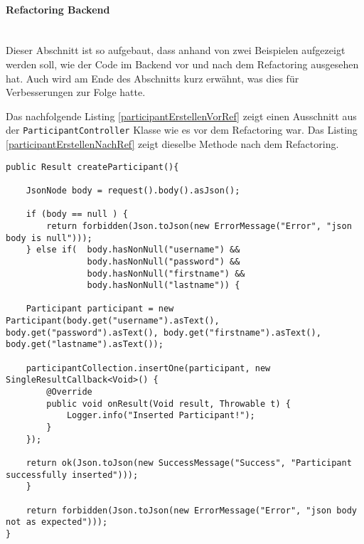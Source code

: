\paragraph*{Refactoring Backend}~\\
Dieser Abschnitt ist so aufgebaut, dass anhand von zwei Beispielen aufgezeigt werden soll, wie der Code im Backend vor und nach dem Refactoring ausgesehen hat. Auch wird am Ende des Abschnitts kurz erwähnt, was dies für Verbesserungen zur Folge hatte.

Das nachfolgende Listing \ref{participantErstellenVorRef} zeigt einen Ausschnitt aus der \texttt{Participant\-Controller} Klasse wie es vor dem Refactoring war. Das Listing \ref{participantErstellenNachRef} zeigt dieselbe Methode nach dem Refactoring.

\lstset{language=JAVA, showstringspaces=false, frame=single, captionpos=b, label=createParticipant, breaklines=true, numbers=left}
\begin{lstlisting}[caption={Participant erstellen vor Refactoring}, label=participantErstellenVorRef]
public Result createParticipant(){

    JsonNode body = request().body().asJson();

    if (body == null ) {
        return forbidden(Json.toJson(new ErrorMessage("Error", "json body is null")));
    } else if(  body.hasNonNull("username") &&
            	body.hasNonNull("password") &&
            	body.hasNonNull("firstname") &&
            	body.hasNonNull("lastname")) {

    Participant participant = new Participant(body.get("username").asText(), body.get("password").asText(), body.get("firstname").asText(), body.get("lastname").asText());

    participantCollection.insertOne(participant, new SingleResultCallback<Void>() {
        @Override
        public void onResult(Void result, Throwable t) {
            Logger.info("Inserted Participant!");
        }
    });

    return ok(Json.toJson(new SuccessMessage("Success", "Participant successfully inserted")));
    }

    return forbidden(Json.toJson(new ErrorMessage("Error", "json body not as expected")));
}
\end{lstlisting}

